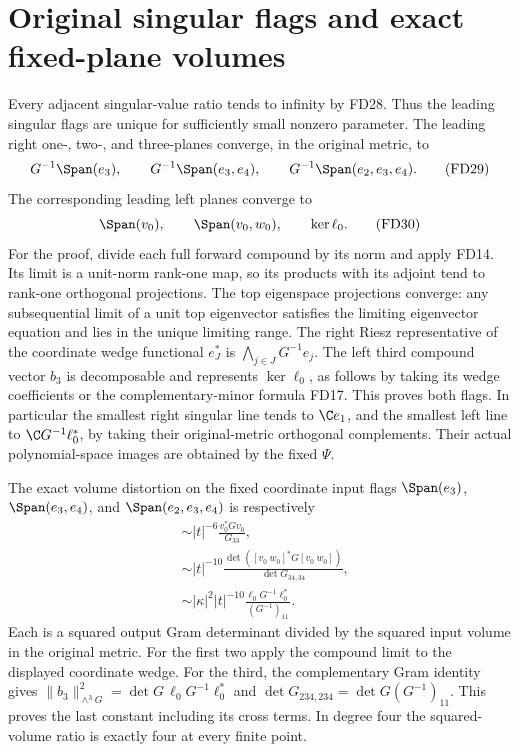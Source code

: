 \section{Original singular flags and exact fixed-plane volumes}
Every adjacent singular-value ratio tends to infinity
by FD28. Thus the leading singular flags are unique for
sufficiently small nonzero parameter. The leading right
one-, two-, and three-planes converge, in the original
metric, to
\[
 G^{-1}\Span(e_3),\qquad
 G^{-1}\Span(e_3,e_4),\qquad
 G^{-1}\Span(e_2,e_3,e_4).
 \tag{FD29}
\]
The corresponding leading left planes converge to
\[
 \Span(v_0),\qquad \Span(v_0,w_0),\qquad \ker\ell_0.
 \tag{FD30}
\]
For the proof, divide each full forward compound by its
norm and apply FD14. Its limit is a unit-norm rank-one
map, so its products with its adjoint tend to rank-one
orthogonal projections. The top eigenspace projections
converge: any subsequential limit of a unit top eigenvector
satisfies the limiting eigenvector equation and lies in
the unique limiting range. The right Riesz representative
of the coordinate wedge functional \(e_J^*\) is
\(\bigwedge_{j\in J}G^{-1}e_j\). The left third compound
vector \(b_3\) is decomposable and represents \(\ker\ell_0\),
as follows by taking its wedge coefficients or the
complementary-minor formula FD17. This proves both flags.
In particular the smallest right singular line tends to
\(\C e_1\), and the smallest left line to
\(\C G^{-1}\ell_0^*\), by taking their original-metric
orthogonal complements. Their actual polynomial-space
images are obtained by the fixed \(\Psi\).

The exact volume distortion on the fixed coordinate
input flags \(\Span(e_3)\), \(\Span(e_3,e_4)\), and
\(\Span(e_2,e_3,e_4)\) is respectively
\[
\begin{aligned}
 &\sim |t|^{-6}\frac{v_0^*Gv_0}{G_{33}},\\
 &\sim |t|^{-10}
              \frac{\det([v_0\ w_0]^*G[v_0\ w_0])}{\det G_{34,34}},\\
 &\sim |\kappa|^2|t|^{-10}
              \frac{\ell_0G^{-1}\ell_0^*}{(G^{-1})_{11}}.
\end{aligned}\tag{FD31}
\]
Each is a squared output Gram determinant divided by
the squared input volume in the original metric. For
the first two apply the compound limit to the displayed
coordinate wedge. For the third, the complementary
Gram identity gives
\(\|b_3\|_{\wedge^3G}^2
=\det G\,\ell_0G^{-1}\ell_0^*\) and
\(\det G_{234,234}=\det G(G^{-1})_{11}\).
This proves the last constant including its cross terms.
In degree four the squared-volume ratio is exactly four
at every finite point.

